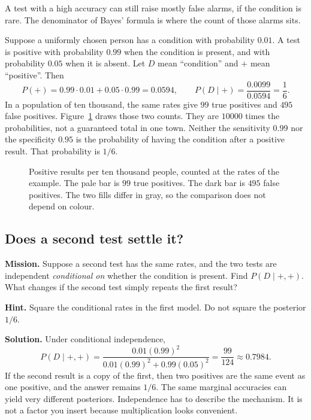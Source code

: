 A test with a high accuracy can still raise mostly false alarms, if the condition is rare. The denominator of Bayes' formula is where the count of those alarms sits.

\begin{examplex}
Suppose a uniformly chosen person has a condition with probability $0.01$. A test is positive with probability $0.99$ when the condition is present, and with probability $0.05$ when it is absent. Let $D$ mean ``condition'' and $+$ mean ``positive''. Then
\[
P(+)=0.99\cdot0.01+0.05\cdot0.99=0.0594,
\qquad P(D\mid+)=\frac{0.0099}{0.0594}=\frac16.
\]
In a population of ten thousand, the same rates give $99$ true positives and $495$ false positives. Figure~\ref{fig:bayes} draws those two counts. They are $10000$ times the probabilities, not a guaranteed total in one town. Neither the sensitivity $0.99$ nor the specificity $0.95$ is the probability of having the condition after a positive result. That probability is $1/6$.
\end{examplex}

\begin{figure}[ht]\centering{}
\caption{Positive results per ten thousand people, counted at the rates of the example. The pale bar is $99$ true positives. The dark bar is $495$ false positives. The two fills differ in gray, so the comparison does not depend on colour.}\label{fig:bayes}\end{figure}

\subsection*{Does a second test settle it?}
\textbf{Mission.} Suppose a second test has the same rates, and the two tests are independent \emph{conditional on} whether the condition is present. Find $P(D\mid+,+)$. What changes if the second test simply repeats the first result?

\textbf{Hint.} Square the conditional rates in the first model. Do not square the posterior $1/6$.

\textbf{Solution.} Under conditional independence,
\[
P(D\mid+,+)=\frac{0.01(0.99)^2}{0.01(0.99)^2+0.99(0.05)^2}
=\frac{99}{124}\approx0.7984.
\]
If the second result is a copy of the first, then two positives are the same event as one positive, and the answer remains $1/6$. The same marginal accuracies can yield very different posteriors. Independence has to describe the mechanism. It is not a factor you insert because multiplication looks convenient.

